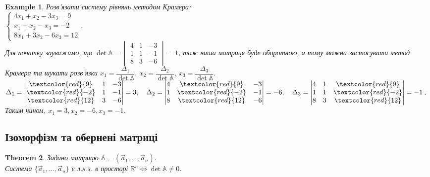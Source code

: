 \documentclass[a4paper, 10pt]{article}
\theoremstyle{theoremdd}
\newtheorem{theorem}{Theorem}[subsection]
\newtheorem{example}[theorem]{Example}
\begin{document}
\begin{example}
Розв'язати систему рівнянь методом Крамера:\\
$\begin{cases}
4x_1 + x_2 - 3x_3 = 9 \\
x_1 + x_2 - x_3 = -2 \\
8x_1 + 3x_2 - 6x_3 = 12
 \end{cases}$.\\
 Для початку зауважимо, що $\det \mathbb{A} = \begin{vmatrix}
 4 & 1 & - 3\\
 1 & 1 & - 1 \\
 8 & 3 & - 6
 \end{vmatrix} = 1$, тож наша матриця буде оборотною, а тому можна застосувати метод Крамера та шукати розв'язки $x_1 = \dfrac{\Delta_1}{\det \mathbb{A}},\ x_2 = \dfrac{\Delta_2}{\det \mathbb{A}},\ x_3 = \dfrac{\Delta_3}{\det \mathbb{A}}$.\\
$\Delta_1 = \begin{vmatrix}
 \textcolor{red}{9} & 1 & - 3\\
 \textcolor{red}{-2} & 1 & - 1 \\
 \textcolor{red}{12} & 3 & - 6
\end{vmatrix} = 3, \quad \Delta_2 = \begin{vmatrix}
 4 & \textcolor{red}{9} & - 3\\
 1 & \textcolor{red}{-2} & - 1 \\
 8 & \textcolor{red}{12} & - 6
\end{vmatrix} = -6, \quad \Delta_3 = \begin{vmatrix}
 4 & 1 & \textcolor{red}{9} \\
 1 & 1 & \textcolor{red}{-2} \\
 8 & 3 & \textcolor{red}{12}
\end{vmatrix} = -1$.\\
Таким чином, $x_1 = 3, x_2 = -6, x_3 = -1$.
\end{example}

\subsection{Ізоморфізм та обернені матриці}
\begin{theorem}
Задано матрицю $\mathbb{A} = (\vec{a}_1,\dots,\vec{a}_n)$.\\
Система $\{\vec{a}_1, \dots, \vec{a}_n\}$ є л.н.з. в просторі $\mathbb{R}^n \iff \det \mathbb{A} \neq 0$.
\end{theorem}
\end{document}
